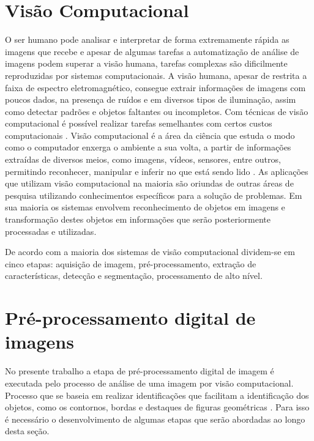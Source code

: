 \section{Visão Computacional}
O ser humano pode analisar e interpretar de forma extremamente rápida as imagens que recebe e apesar de algumas tarefas a automatização de análise de imagens podem superar a visão humana, tarefas complexas são dificilmente reproduzidas por sistemas computacionais\cite{Deteccao_de_pele_humana_em_imagens_veiculadas_na_web}. A visão humana, apesar de restrita a faixa de espectro eletromagnético, consegue extrair informações de imagens com poucos dados, na presença de ruídos e em diversos tipos de iluminação, assim como detectar padrões e objetos faltantes ou incompletos. Com técnicas de visão computacional é possível realizar tarefas semelhantes com certos custos computacionais \cite{Deteccao_de_pele_humana_em_imagens_veiculadas_na_web}.  
Visão computacional é a área da ciência que estuda o modo como o computador enxerga o ambiente a sua volta, a partir de informações extraídas de diversos meios, como imagens, vídeos, sensores, entre outros, permitindo reconhecer, manipular e inferir no que está sendo lido \cite{ballard1982computer}.
As aplicações que utilizam visão computacional na maioria são oriundas
de outras áreas de pesquisa utilizando conhecimentos específicos para a solução de problemas. Em sua maioria os sistemas envolvem reconhecimento de objetos em imagens e transformação destes objetos em informações que serão posteriormente processadas e utilizadas. 

De acordo com \cite{rehem2009tecnicas} a maioria dos sistemas de visão computacional dividem-se em cinco etapas: aquisição de imagem, pré-processamento, extração de características, detecção e segmentação,
processamento de alto nível. 

\section{Pré-processamento digital de imagens}
No presente trabalho a etapa de pré-processamento digital de imagem é executada pelo processo de análise de uma imagem por visão computacional. Processo que se baseia em realizar identificações que facilitam a identificação dos objetos, como os contornos, bordas e destaques de figuras geométricas \cite{rehem2009tecnicas}. Para isso é necessário o desenvolvimento de algumas etapas que serão abordadas ao longo desta seção.


